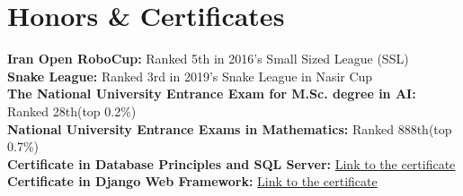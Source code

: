 
\section{Honors \& Certificates}
  \vspace{2pt}
  \resumeSubHeadingListStart
    \small{\item{
        \textbf{Iran Open RoboCup:} { Ranked 5th in 2016's Small Sized League (SSL)}
        \\ \vspace{3pt}
        \textbf{Snake League:} { Ranked 3rd in 2019's Snake League in Nasir Cup}
        \\ \vspace{3pt}
        \textbf{The National University Entrance Exam for M.Sc. degree in AI:} { Ranked 28th(top 0.2\%)}
        \\ \vspace{3pt}
        \textbf{National University Entrance Exams in Mathematics:} { Ranked 888th(top 0.7\%)}
        \\ \vspace{3pt}
        \textbf{Certificate in Database Principles and SQL Server:} \href{https://maktabkhooneh.org/certificates/MK-O1USZA/?print=True}{\color{blue} Link to the certificate}
        \\ \vspace{3pt}
        \textbf{Certificate in Django Web Framework:} \href{https://www.coursera.org/account/accomplishments/verify/ZZDP44XE9B4G}{\color{blue} Link to the certificate}
    }}
  \resumeSubHeadingListEnd